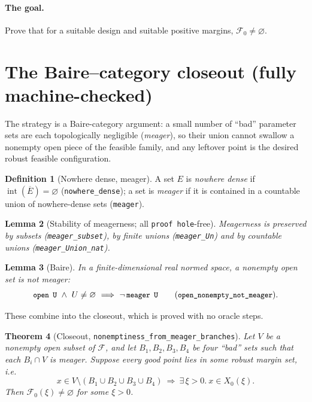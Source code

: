 \documentclass[11pt]{article}
\theoremstyle{plain}
\newtheorem{theorem}{Theorem}[section]
\newtheorem{lemma}[theorem]{Lemma}
\theoremstyle{definition}
\newtheorem{definition}[theorem]{Definition}
\theoremstyle{remark}
\newcommand{\Ffeas}{\mathcal{F}}      %
\newcommand{\Fzero}{\mathcal{F}_{0}}  %
\newcommand{\Xnull}{X_{0}}
\newcommand{\code}[1]{\texttt{\small #1}}
\DeclareMathOperator{\interior}{int}
\begin{document}
\paragraph{The goal.}  Prove that for a suitable design and suitable positive
margins, $\Fzero\ne\varnothing$.

\section{The Baire--category closeout (fully machine-checked)}\label{sec:baire}

The strategy is a Baire-category argument: a small number of ``bad'' parameter
sets are each topologically negligible (\emph{meager}), so their union cannot
swallow a nonempty open piece of the feasible family, and any leftover point is
the desired robust feasible configuration.

\begin{definition}[Nowhere dense, meager]
A set $E$ is \emph{nowhere dense} if $\interior(\overline E)=\varnothing$
(\code{nowhere\_dense}); a set is \emph{meager} if it is contained in a countable
union of nowhere-dense sets (\code{meager}).
\end{definition}

\begin{lemma}[Stability of meagerness; all \code{proof hole}-free]
Meagerness is preserved by subsets (\code{meager\_subset}), by finite unions
(\code{meager\_Un}) and by countable unions (\code{meager\_Union\_nat}).
\end{lemma}

\begin{lemma}[Baire]\label{lem:baire}
In a finite-dimensional real normed space, a nonempty open set is not meager:
\[
  \text{\code{open U}}\ \wedge\ U\ne\varnothing\ \Longrightarrow\ \neg\,\text{\code{meager U}}
  \qquad(\code{open\_nonempty\_not\_meager}).
\]
\end{lemma}

These combine into the closeout, which is proved with no oracle steps.

\begin{theorem}[Closeout, \code{nonemptiness\_from\_meager\_branches}]\label{thm:closeout}
Let $V$ be a nonempty open subset of $\Ffeas$, and let
$B_1,B_2,B_3,B_4$ be four ``bad'' sets such that each $B_i\cap V$ is meager.
Suppose every good point lies in some robust margin set, i.e.
\[
  x\in V\setminus(B_1\cup B_2\cup B_3\cup B_4)
   \ \Longrightarrow\ \exists\,\xi>0.\ x\in\Xnull(\xi).
\]
Then $\Fzero(\xi)\ne\varnothing$ for some $\xi>0$.
\end{theorem}
\end{document}
